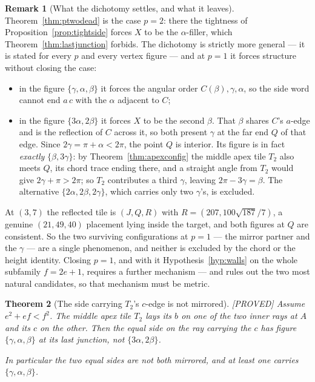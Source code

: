 \documentclass[11pt,reqno]{amsart}
\theoremstyle{plain}
\newtheorem{theorem}{Theorem}
\theoremstyle{definition}
\newtheorem{remark}[theorem]{Remark}
\newcommand{\lab}[1]{\hfill\textnormal{\footnotesize\textsc{[#1]}}}
\begin{document}
\begin{remark}[What the dichotomy settles, and what it leaves]\label{rem:dichotomy}
Theorem~\ref{thm:ptwodead} is the case $p=2$: there the tightness of Proposition~\ref{prop:tightside}
forces $X$ to be the $\alpha$-filler, which Theorem~\ref{thm:lastjunction} forbids. The dichotomy is
strictly more general --- it is stated for every $p$ and every vertex figure --- and at $p=1$ it
forces structure without closing the case:

\begin{itemize}
\item[] in the figure $\{\gamma,\alpha,\beta\}$ it forces the angular order $C(\beta),\gamma,\alpha$,
so the side word cannot end $a\,c$ with the $\alpha$ adjacent to $C$;
\item[] in the figure $\{3\alpha,2\beta\}$ it forces $X$ to be the second $\beta$. That $\beta$ shares
$C$'s $a$-edge and is the reflection of $C$ across it, so both present $\gamma$ at the far end $Q$ of
that edge. Since $2\gamma=\pi+\alpha<2\pi$, the point $Q$ is interior. Its figure is in fact
\emph{exactly} $\{\beta,3\gamma\}$: by Theorem~\ref{thm:apexconfig} the middle apex tile $T_2$ also
meets $Q$, its chord trace ending there, and a straight angle from $T_2$ would give
$2\gamma+\pi>2\pi$; so $T_2$ contributes a third $\gamma$, leaving $2\pi-3\gamma=\beta$. The
alternative $\{2\alpha,2\beta,2\gamma\}$, which carries only two $\gamma$'s, is excluded.
\end{itemize}

At $(3,7)$ the reflected tile is $(J,Q,R)$ with $R=(207,100\sqrt{187}/7)$, a genuine $(21,49,40)$
placement lying inside the target, and both figures at $Q$ are consistent. So the two surviving
configurations at $p=1$ --- the mirror partner and the $\gamma$ --- are a single phenomenon, and
neither is excluded by the chord or the height identity. Closing $p=1$, and with it
Hypothesis~\ref{hyp:walls} on the whole subfamily $f=2e+1$, requires a further mechanism ---
and \cite{Obstructions} rules out the two most natural candidates, so that mechanism must be metric.
\end{remark}

\begin{theorem}[The side carrying $T_2$'s $c$-edge is not mirrored]\label{thm:nobothmirror}\lab{PROVED}
Assume $e^{2}+ef<f^{2}$. The middle apex tile $T_2$ lays its $b$ on one of the two inner rays at $A$
and its $c$ on the other. Then the equal side on the ray carrying the $c$ has figure
$\{\gamma,\alpha,\beta\}$ at its last junction, not $\{3\alpha,2\beta\}$.

In particular the two equal sides are not both mirrored, and at least one carries
$\{\gamma,\alpha,\beta\}$.
\end{theorem}
\end{document}
